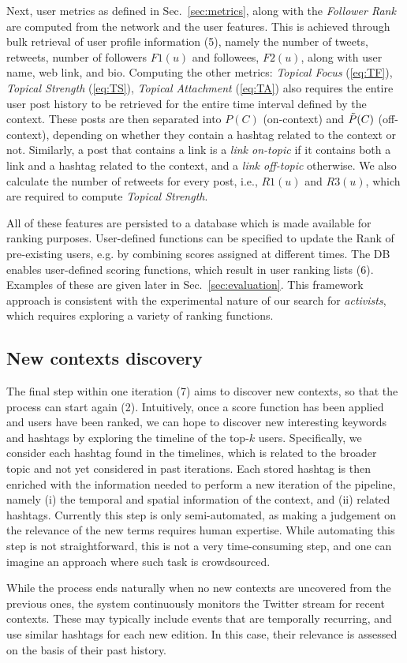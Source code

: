 Next, user metrics as defined in Sec.~\ref{sec:metrics}, along with the \textit{Follower Rank} are computed from the network and the user features.
%
This is achieved through bulk retrieval of user profile information (5), namely the number of tweets, retweets,  number of followers $F1(u)$ and followees, $F2(u)$, along with user name, web link, and bio.
%
Computing the other metrics: \textit{Topical Focus} (\ref{eq:TF}), \textit{Topical Strength} (\ref{eq:TS}), \textit{Topical Attachment} (\ref{eq:TA}) also requires the entire user post history to be retrieved for the entire time interval defined by the context.
These posts are then separated into $P(C)$ (on-context) and $\Tilde{P}(C)$ (off-context), depending on whether they contain a hashtag related to the context or not.
Similarly, a post that contains a link is a \textit{link on-topic} if it contains both a link and a hashtag related to the context, and a \textit{link off-topic} otherwise.
We also calculate the number of retweets for every post, i.e., $\mathit{R1}(u)$ and $\mathit{R3}(u)$, which are required to compute \textit{Topical Strength}.

All of these features are persisted to a database which is made available for ranking purposes.
User-defined functions can be specified to update the Rank of pre-existing users, e.g. by combining scores assigned at different times.
%
The DB enables user-defined scoring functions, which result in user ranking lists (6). Examples of these are given later in Sec.~\ref{sec:evaluation}.
This framework approach is consistent with the experimental nature of our search for \textit{activists}, which requires exploring a variety of ranking functions.

\subsection{New contexts discovery} \label{sec:context-discovery}

The final step within one iteration (7) aims to discover new contexts, so that the process can start again (2).
Intuitively, once a score function has been applied and users have been ranked, we can hope to discover new interesting keywords and hashtags by exploring the timeline of the top-$k$ users.
Specifically,  we consider each hashtag found in the timelines, which is related to the broader topic and not yet considered in past iterations.
Each stored hashtag is then enriched with the information needed to perform a new iteration of the pipeline, namely (i) the temporal and spatial information of the context, and (ii) related hashtags.
%
Currently this step is only semi-automated, as making a judgement on the relevance of the new terms requires  human expertise.
While automating this step is not straightforward, this is not a very time-consuming step, and one can imagine an approach where such task is crowdsourced.

While the process ends naturally when no new contexts are uncovered from the previous ones, the system continuously monitors the Twitter stream for recent contexts. These may typically include events that are temporally recurring, and use similar hashtags for each new edition. In this case, their relevance is assessed on the basis of their past history.